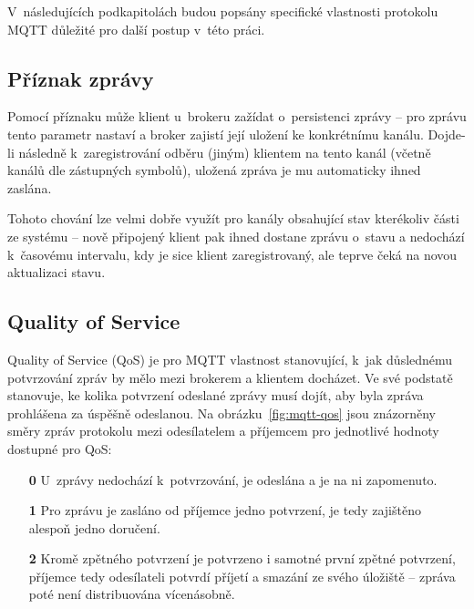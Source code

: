 V~následujících podkapitolách budou popsány specifické vlastnosti protokolu MQTT důležité pro další postup v~této
práci.

\subsection{Příznak zprávy }\label{subsec:priznak-zpravy-retain}
Pomocí příznaku  může klient u~brokeru zažídat o~persistenci zprávy -- pro zprávu tento parametr nastaví a
broker zajistí její uložení ke konkrétnímu kanálu.
Dojde-li následně k~zaregistrování odběru (jiným) klientem na tento kanál (včetně kanálů dle zástupných symbolů),
uložená zpráva je mu automaticky ihned zaslána.

Tohoto chování lze velmi dobře využít pro kanály obsahující stav kterékoliv části ze systému --
nově připojený klient pak ihned dostane zprávu o~stavu a nedochází k~časovému intervalu, kdy je sice klient
zaregistrovaný, ale teprve čeká na novou aktualizaci stavu.

\subsection{Quality of Service}\label{subsec:quality-of-service}
Quality of Service (QoS) je pro MQTT vlastnost stanovující, k~jak důslednému potvrzování zpráv by mělo mezi
brokerem a klientem docházet.
Ve své podstatě stanovuje, ke kolika potvrzení odeslané zprávy musí dojít, aby byla
zpráva prohlášena za úspěšně odeslanou.
Na obrázku~\ref{fig:mqtt-qos} jsou znázorněny směry zpráv protokolu mezi odesílatelem a příjemcem pro jednotlivé
hodnoty dostupné pro QoS:

\begin{enumerate}
    \item[\textbf{0}] U~zprávy nedochází k~potvrzování, je odeslána a je na ni zapomenuto.
    \item[\textbf{1}] Pro zprávu je zasláno od příjemce jedno potvrzení, je tedy zajištěno alespoň jedno doručení.
    \item[\textbf{2}] Kromě zpětného potvrzení je potvrzeno i samotné první zpětné potvrzení, příjemce tedy
    odesílateli potvrdí příjetí a smazání ze svého úložiště -- zpráva poté není distribuována vícenásobně.
\end{enumerate}

